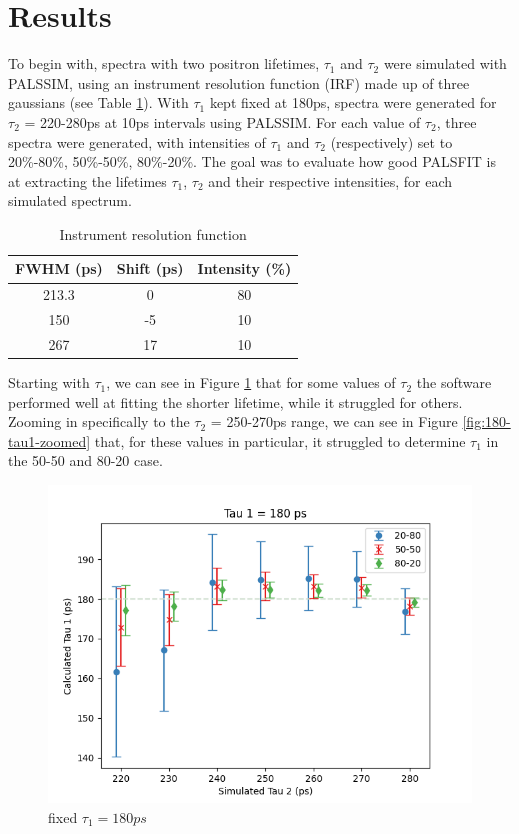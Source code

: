 \chapter*{Results}

To begin with, spectra with two positron lifetimes, $\tau_1$ and $\tau_2$ were simulated with PALSSIM, using an instrument resolution function (IRF) made up of three gaussians (see Table \ref{tab:irf}). With $\tau_1$ kept fixed at 180ps, spectra were generated for $\tau_2$  = 220-280ps at 10ps intervals using PALSSIM. For each value of $\tau_2$, three spectra were generated, with intensities of $\tau_1$ and $\tau_2$ (respectively) set to 20\%-80\%, 50\%-50\%, 80\%-20\%. The goal was to evaluate how good PALSFIT is at extracting the lifetimes $\tau_1$, $\tau_2$ and their respective intensities, for each simulated spectrum. 

\begin{table}[h]
    \centering
    \begin{tabular}{|c|c|c|}
        \hline
        FWHM (ps) &  Shift (ps) & Intensity (\%) \\
        \hline
        213.3 & 0 & 80\\ 
        150 & -5 & 10\\ 
        267 & 17 & 10\\  
        \hline
    \end{tabular}
    \caption{Instrument resolution function}
    \label{tab:irf}
\end{table}

Starting with $\tau_1$, we can see in Figure \ref{fig:180-tau1} that for some values of $\tau_2$ the software performed well at fitting the shorter lifetime, while it struggled for others. 
Zooming in specifically to the $\tau_2$ = 250-270ps range, we can see in Figure \ref{fig:180-tau1-zoomed} that, for these values in particular, it struggled to determine $\tau_1$ in the 50-50 and 80-20 case. 

\begin{figure}[h]
    \centering
    \includegraphics[width=0.8\linewidth]{Batch 1+2/Tau1.png}
    \caption{fixed $\tau_1 = 180ps$}
    \label{fig:180-tau1}
\end{figure}

